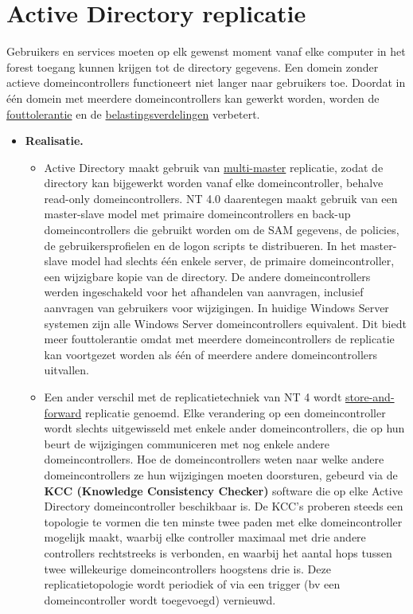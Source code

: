 	\section{Active Directory replicatie }
	\begin{enumerate}
		 {
			Gebruikers en services moeten op elk gewenst moment vanaf elke computer in het forest toegang kunnen krijgen tot de directory gegevens. Een domein zonder actieve domeincontrollers functioneert niet langer naar gebruikers toe. Doordat in één domein met meerdere domeincontrollers kan gewerkt worden, worden de \underline{fouttolerantie} en de \underline{belastingsverdelingen} verbetert.
			
		}
		
		 { 
			\begin{itemize}
				\item \textbf{Realisatie.}
				\begin{itemize}
					\item Active Directory maakt gebruik van \underline{multi-master} replicatie, zodat de directory kan bijgewerkt worden vanaf elke domeincontroller, behalve read-only domeincontrollers. NT 4.0 daarentegen maakt gebruik van een master-slave model met primaire domeincontrollers en back-up domeincontrollers die gebruikt worden om de SAM gegevens, de policies, de gebruikersprofielen en de logon scripts te distribueren. In het master-slave model had slechts één enkele server, de primaire domeincontroller, een wijzigbare kopie van de directory. De andere domeincontrollers werden ingeschakeld voor het afhandelen van aanvragen, inclusief aanvragen van gebruikers voor wijzigingen. In huidige Windows Server systemen zijn alle Windows Server domeincontrollers equivalent. Dit biedt meer fouttolerantie omdat met meerdere domeincontrollers de replicatie kan voortgezet worden als één of meerdere andere domeincontrollers uitvallen. 
					\item Een ander verschil met de replicatietechniek van NT 4 wordt \underline{store-and-forward} replicatie genoemd. Elke verandering op een domeincontroller wordt slechts uitgewisseld met enkele ander domeincontrollers, die op hun beurt de wijzigingen communiceren met nog enkele andere domeincontrollers. Hoe de domeincontrollers weten naar welke andere domeincontrollers ze hun wijzigingen moeten doorsturen, gebeurd via de \textbf{KCC (Knowledge Consistency Checker)} software die op elke Active Directory domeincontroller beschikbaar is. De KCC's proberen steeds een topologie te vormen die ten minste twee paden met elke domeincontroller mogelijk maakt, waarbij elke controller maximaal met drie andere controllers rechtstreeks is verbonden, en waarbij het aantal hops tussen twee willekeurige domeincontrollers hoogstens drie is. Deze replicatietopologie wordt periodiek of via een trigger (bv een domeincontroller wordt toegevoegd) vernieuwd. 
					

\end{itemize}
\end{itemize}}
\end{enumerate}
